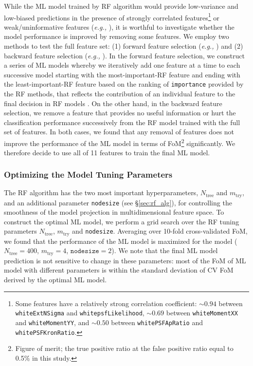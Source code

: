 \documentclass[twocolumn]{aastex62}
\begin{document}
{While the ML model trained by RF algorithm 
would provide low-variance and low-biased predictions 
in the presence of strongly correlated features\footnote{Some features have a relatively strong correlation coefficient: 
$\sim0.94$ between \texttt{whiteExtNSigma} and \texttt{whitepsfLikelihood}, 
$\sim0.69$ between \texttt{whiteMomentXX} and \texttt{whiteMomentYY}, and 
$\sim0.50$ between \texttt{whitePSFApRatio} and \texttt{whitePSFKronRatio}. }
 or weak/uninformative features ({\it e.g.,} \citealt{Richards12a}), 
it is worthful to investigate whether the model performance is improved by removing some features. 
We employ two methods to test the full feature set: 
(1) forward feature selection ({\it e.g.,} \citealt{Richards12a, Miller17}) and 
(2) backward feature selection ({\it e.g.,} \citealt{Brink13}). 
In the forward feature selection, 
we construct a series of ML models whereby we iteratively add one feature 
at a time to each successive model starting with the most-important-RF feature 
and ending with the least-important-RF feature 
based on the ranking of \texttt{importance} provided by the RF methods, 
that reflects the contribution of an individual feature to the final decision in RF models \citep{Breiman01, Breiman02}. 
On the other hand, in the backward feature selection, 
we remove a feature that provides no
useful information or hurt the classification performance 
successively from the RF model trained with the full set of features. 
In both cases, we found that any removal of features does not improve the performance of the ML model 
in terms of FoM\footnote{Figure of merit; the true positive ratio at the false positive ratio equal to 0.5\% in this study. } 
significantly. 
We therefore decide to use all of 11 features to train the final ML model. 

\subsubsection{Optimizing the Model Tuning Parameters}
The RF algorithm has the two most important hyperparameters, $N_{\mathrm{tree}}$ and $m_{\mathrm{try}}$, 
and an additional parameter \texttt{nodesize} (see \S\ref{sec:rf_alg}), 
for controlling the smoothness of the model projection in multidimensional feature space. 
To construct the optimal ML model, we perform a grid search over the RF tuning parameters 
$N_{\mathrm{tree}}$, $m_{\mathrm{try}}$ and \texttt{nodesize}. 
Averaging over 10-fold cross-validated FoM, 
we found that the performance of the ML model is maximized for the model 
($N_{\mathrm{tree}} = 400$, $m_{\mathrm{try}} = 4$, $\mathtt{nodesize} = 2$). 
We note that the final ML model prediction is not sensitive to change in these parameters: 
most of the FoM of ML model with different parameters is within the standard deviation 
of CV FoM derived by the optimal ML model. 
}
\end{document}
